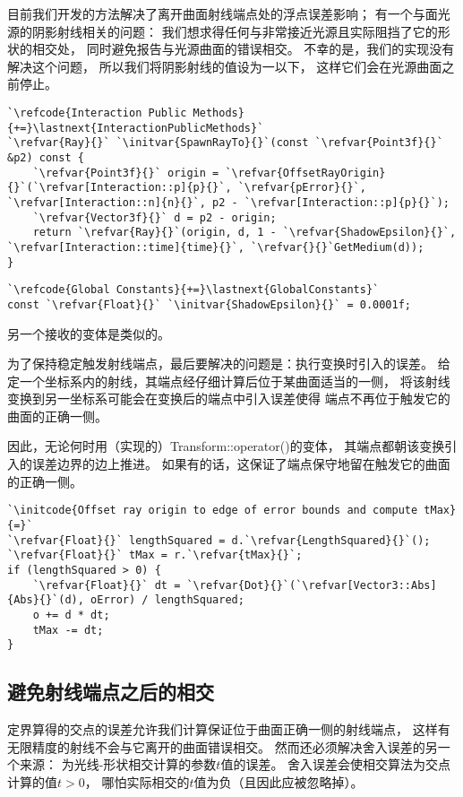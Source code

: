 目前我们开发的方法解决了离开曲面射线端点处的浮点误差影响；
有一个与面光源的阴影射线相关的问题：
我们想求得任何与非常接近光源且实际阻挡了它的形状的相交处，
同时避免报告与光源曲面的错误相交。
不幸的是，我们的实现没有解决这个问题，
所以我们将阴影射线的值设为一以下，
这样它们会在光源曲面之前停止。
\begin{lstlisting}
`\refcode{Interaction Public Methods}{+=}\lastnext{InteractionPublicMethods}`
`\refvar{Ray}{}` `\initvar{SpawnRayTo}{}`(const `\refvar{Point3f}{}` &p2) const {
    `\refvar{Point3f}{}` origin = `\refvar{OffsetRayOrigin}{}`(`\refvar[Interaction::p]{p}{}`, `\refvar{pError}{}`, `\refvar[Interaction::n]{n}{}`, p2 - `\refvar[Interaction::p]{p}{}`);
    `\refvar{Vector3f}{}` d = p2 - origin;
    return `\refvar{Ray}{}`(origin, d, 1 - `\refvar{ShadowEpsilon}{}`, `\refvar[Interaction::time]{time}{}`, `\refvar{}{}`GetMedium(d));
}
\end{lstlisting}
\begin{lstlisting}
`\refcode{Global Constants}{+=}\lastnext{GlobalConstants}`
const `\refvar{Float}{}` `\initvar{ShadowEpsilon}{}` = 0.0001f;
\end{lstlisting}

另一个接收的变体是类似的。

为了保持稳定触发射线端点，最后要解决的问题是：执行变换时引入的误差。
给定一个坐标系内的射线，其端点经仔细计算后位于某曲面适当的一侧，
将该射线变换到另一坐标系可能会在变换后的端点中引入误差使得
端点不再位于触发它的曲面的正确一侧。

因此，无论何时用（实现的）{\ttfamily Transform::operator()}的变体，
其端点都朝该变换引入的误差边界的边上推进。
如果有的话，这保证了端点保守地留在触发它的曲面的正确一侧。
\begin{lstlisting}
`\initcode{Offset ray origin to edge of error bounds and compute tMax}{=}`
`\refvar{Float}{}` lengthSquared = d.`\refvar{LengthSquared}{}`();
`\refvar{Float}{}` tMax = r.`\refvar{tMax}{}`;
if (lengthSquared > 0) {
    `\refvar{Float}{}` dt = `\refvar{Dot}{}`(`\refvar[Vector3::Abs]{Abs}{}`(d), oError) / lengthSquared;
    o += d * dt;
    tMax -= dt;
}
\end{lstlisting}

\subsection{避免射线端点之后的相交}\label{sub:避免射线端点之后的相交}

定界算得的交点的误差允许我们计算保证位于曲面正确一侧的射线端点，
这样有无限精度的射线不会与它离开的曲面错误相交。
然而还必须解决舍入误差的另一个来源：
为光线-形状相交计算的参数$t$值的误差。
舍入误差会使相交算法为交点计算的值$t>0$，
哪怕实际相交的$t$值为负（且因此应被忽略掉）。

